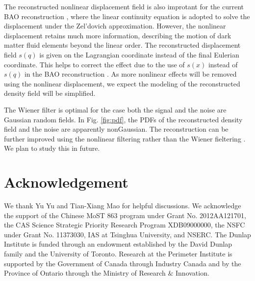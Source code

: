 \documentclass[aps,prd,twocolumn,showpacs,superscriptaddress,groupedaddress,nofootinbib]{revtex4}  %
\newcommand{\tcb}{\textcolor{blue}}
\begin{document}
The reconstructed nonlinear displacement field is also improtant for the 
current BAO reconstruction \cite{2007bao}, where the linear continuity
equation is adopted to solve the displacement under the Zel'dovich 
approximation. 
However, the nonlinear displacement retains much more information, describing 
the motion of dark matter fluid elements beyond the linear order.
The reconstructed displacement field $s(q)$ is given on the Lagrangian 
coordinate instead of the final Eulerian coordinate. 
This helps to correct the effect due to the use of $s(x)$ instead of $s(q)$ 
in the BAO reconstruction \cite{2015MNRAS.450.3822W,2015PhRvD..92l3522S}.
As more nonlinear effects will be removed using the nonlinear displacement,
we expect the modeling of the reconstructed density field will be simplified.

The Wiener filter is optimal for the case both the signal and the noise are
Gaussian random fields. In Fig. \ref{fig:pdf}, the PDFs of the reconstructed
density field and the noise are apparently nonGaussian.
The reconstruction can be further improved using the nonlinear filtering
rather than the Wiener fieltering \cite{1999RSPTA.357.2561P}.
We plan to study this in future.

\section{Acknowledgement}
We thank Yu Yu and Tian-Xiang Mao for helpful discussions.
We acknowledge the support of the Chinese MoST 863 program under Grant 
No. 2012AA121701, the CAS Science Strategic Priority Research Program 
XDB09000000, the NSFC under Grant No. 11373030, IAS at Tsinghua University, 
 and NSERC.
The Dunlap Institute is funded through an endowment established by the David Dunlap family and the University of Toronto.
Research at the Perimeter Institute is supported by the Government of Canada
through Industry Canada and by the Province of Ontario through the Ministry of
Research $\&$ Innovation.



\end{document}

